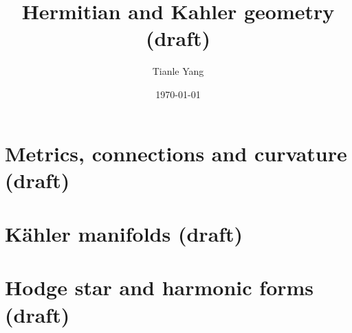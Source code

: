 \documentclass[sectionlevel=chapter]{noteformyself}
\title{Hermitian and Kahler geometry (draft)}
\author{Tianle Yang}
\date{\today}
\begin{document}
    \maketitle

    \tableofcontents

    \section{Metrics, connections and curvature (draft)}
    
    \section{Kähler manifolds (draft)}
    
    \section{Hodge star and harmonic forms (draft)}
    

    \printbibliography[heading=bibintoc, title={References}]
\end{document}

